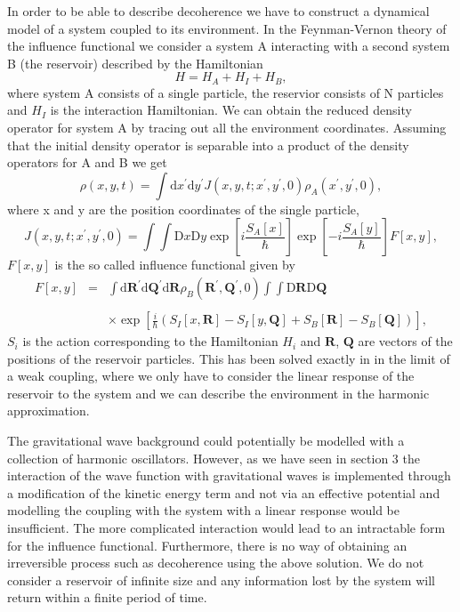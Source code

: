 In order to be able to describe decoherence we have to construct a
dynamical model of a system coupled to its environment. In the
Feynman-Vernon theory of the influence functional \cite{feynman} we
consider a system A interacting with a second system B (the reservoir)
described by the Hamiltonian
\begin{equation}
H = H_A + H_I + H_B,
\end{equation}
where system A consists of a single particle, the reservior consists of
N particles and $H_I$ is the interaction Hamiltonian. We can obtain
the reduced density operator for system A by tracing out all the
environment coordinates. Assuming that the initial density operator is
separable into a product of the density operators for A and B we get
\begin{equation}
\rho(x, y, t) = \int \mathrm{d} x^\prime \mathrm{d} y^\prime J(x, y,
t; x^\prime, y^\prime, 0)\rho_A(x^\prime, y^\prime, 0),
\end{equation}
where x and y are the position coordinates of the single particle,
\begin{equation}
J(x, y, t; x^\prime, y^\prime, 0) = \int \int \mathrm{D} x \mathrm{D}
y \exp \left[ i \frac{S_A[x]}{\hbar} \right] \exp \left[ -i
  \frac{S_A[y]}{\hbar} \right] F[x, y],
\end{equation}
$F[x, y]$ is the so called influence functional given by
\begin{equation}
\begin{array} {lcl}
F[x, y] & = & \int \mathrm{d} \bm{R^\prime} \mathrm{d} \bm{Q^\prime}
\mathrm{d} \bm{R} \rho_B(\bm{R^\prime}, \bm{Q^\prime}, 0) \int \int
\mathrm{D} \bm{R} \mathrm{D} \bm{Q} \\\\ & & \times \exp \left[
  \frac{i}{\hbar} \left( S_I[x, \bm{R}] - S_I[y, \bm{Q}] + S_B[\bm{R}]
  - S_B[\bm{Q}] \right) \right],
\end{array}
\end{equation}
$S_i$ is the action corresponding to the Hamiltonian $H_i$ and
$\bm{R}$, $\bm{Q}$ are vectors of the positions of the reservoir
particles. This has been solved exactly in \cite{feynman} in the limit
of a weak coupling, where we only have to consider the linear response
of the reservoir to the system and we can describe the environment in
the harmonic approximation.

The gravitational wave background could potentially be modelled with a
collection of harmonic oscillators. However, as we have seen in
section 3 the interaction of the wave function with gravitational
waves is implemented through a modification of the kinetic energy term
and not via an effective potential and modelling the coupling with the
system with a linear response would be insufficient. The more
complicated interaction would lead to an intractable form for the
influence functional. Furthermore, there is no way of obtaining an
irreversible process such as decoherence using the above solution. We
do not consider a reservoir of infinite size and any information lost
by the system will return within a finite period of time.

